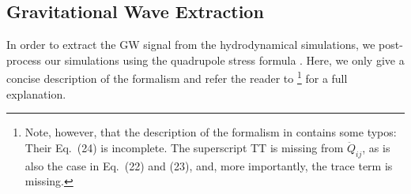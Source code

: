 \subsection{Gravitational Wave Extraction}
In order to extract the GW signal from
the hydrodynamical simulations, we post-process our simulations using
the quadrupole stress formula \citep{finn_89,nakamura_89,blanchet_90}.  Here,
we only give a concise description of the formalism and refer the reader to 
\cite{mueller_e_12}\footnote{Note, however, that the description of the formalism in
\cite{mueller_e_12} contains some typos: Their Eq.~(24) is incomplete. The superscript TT is missing from $\ddot{Q}_{ij}$, as is also the case in Eq.~(22) and (23),
and, more importantly, the trace term is missing.} for a full explanation.

